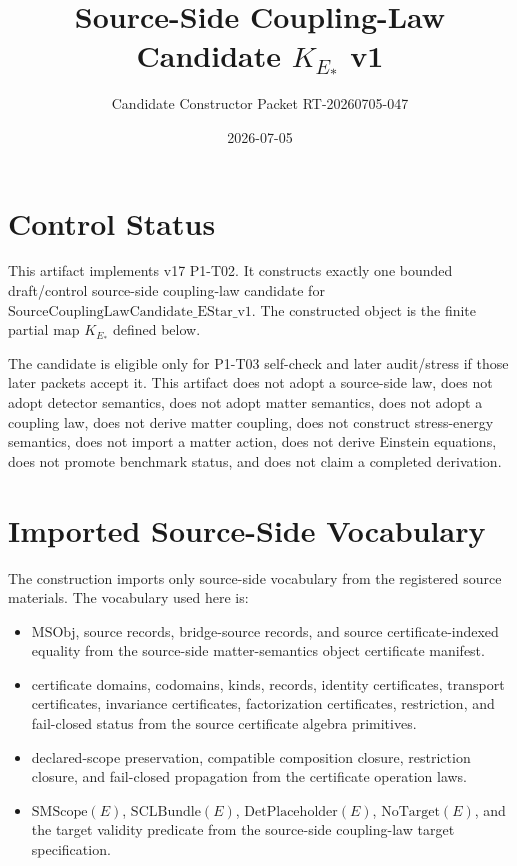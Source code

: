 \documentclass[11pt]{article}
\title{Source-Side Coupling-Law Candidate \(K_{E_{\ast}}\) v1}
\author{Candidate Constructor Packet RT-20260705-047}
\date{2026-07-05}
\newcommand{\SMScope}{\mathrm{SMScope}}
\newcommand{\SCLBundle}{\mathrm{SCLBundle}}
\newcommand{\DetPlaceholder}{\mathrm{DetPlaceholder}}
\newcommand{\KStar}{K_{E_{\ast}}}
\newcommand{\MSObj}{\mathrm{MSObj}}
\newcommand{\NoTarget}{\mathrm{NoTarget}}
\begin{document}
\maketitle

\section{Control Status}

This artifact implements v17 P1-T02. It constructs exactly one bounded
draft/control source-side coupling-law candidate for
\(\mathrm{SourceCouplingLawCandidate\_EStar\_v1}\). The constructed object is
the finite partial map \(\KStar\) defined below.

The candidate is eligible only for P1-T03 self-check and later audit/stress if
those later packets accept it. This artifact does not adopt a source-side law,
does not adopt detector semantics, does not adopt matter semantics, does not
adopt a coupling law, does not derive matter coupling, does not construct
stress-energy semantics, does not import a matter action, does not derive
Einstein equations, does not promote benchmark status, and does not claim a
completed derivation.

\section{Imported Source-Side Vocabulary}

The construction imports only source-side vocabulary from the registered
source materials. The vocabulary used here is:

\begin{itemize}[leftmargin=2em]
  \item \(\MSObj\), source records, bridge-source records, and source
  certificate-indexed equality from the source-side matter-semantics object
  certificate manifest.
  \item certificate domains, codomains, kinds, records, identity certificates,
  transport certificates, invariance certificates, factorization certificates,
  restriction, and fail-closed status from the source certificate algebra
  primitives.
  \item declared-scope preservation, compatible composition closure,
  restriction closure, and fail-closed propagation from the certificate
  operation laws.
  \item \(\SMScope(E)\), \(\SCLBundle(E)\), \(\DetPlaceholder(E)\),
  \(\NoTarget(E)\), and the target validity predicate from the source-side
  coupling-law target specification.
\end{itemize}
\end{document}
